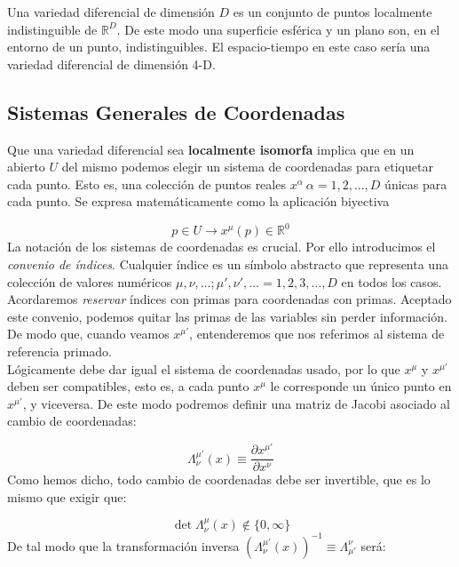\documentclass[12pt,a4paper]{book}
\numberwithin{equation}{section}
\numberwithin{figure}{section}
\newcommand{\parciales}[2]{\frac{\partial #1}{\partial #2}}
\begin{document}
Una variedad diferencial de dimensión $D$ es un conjunto de puntos localmente indistinguible de $\mathbb{R}^D$. De este modo una superficie esférica y un plano son, en el entorno de un punto, indistinguibles. El espacio-tiempo en este caso sería una variedad diferencial de dimensión 4-D. \\

\subsection{Sistemas Generales de Coordenadas}

Que una variedad diferencial sea \textbf{localmente isomorfa} implica que en un abierto $U$ del mismo podemos elegir un sistema de coordenadas para etiquetar cada punto. Esto es, una colección de puntos reales $x^{\alpha} \ \alpha=1,2,...,D$ únicas para cada punto. Se expresa matemáticamente como la aplicación biyectiva 

\begin{equation}
p \in U \longrightarrow x^{\mu} (p) \in \mathbb{R}^0
\end{equation}
La notación de los sistemas de coordenadas es crucial. Por ello introducimos el \textit{convenio de índices}. Cualquier índice es un símbolo abstracto que representa una colección de valores numéricos $\mu,\nu,\ldots;\mu',\nu',\ldots = 1,2,3,\ldots,D$ en todos los casos. Acordaremos \textit{reservar} índices con primas para coordenadas con primas. Aceptado este convenio, podemos quitar las primas de las variables sin perder información. De modo que, cuando veamos $x^{\mu'}$, entenderemos que nos referimos al sistema de referencia primado. \\

Lógicamente debe dar igual el sistema de coordenadas usado, por lo que $x^{\mu}$ y $x^{\mu'}$ deben ser compatibles, esto es, a cada punto $x^{\mu}$ le corresponde un único punto en $x^{\mu'}$, y  viceversa. De este modo podremos definir una matriz de Jacobi asociado al cambio de coordenadas:

\begin{equation}
\Lambda_{\nu}^{\mu'} (x) \equiv \parciales{x^{\mu'}}{x^{\nu}} 
\end{equation}
Como hemos dicho, todo cambio de coordenadas debe ser invertible, que es lo mismo que exigir que:

\begin{equation}
\det \Lambda^{\mu}_{\nu} (x) \notin \{ 0,\infty \}
\end{equation}
De tal modo que la transformación inversa $
(\Lambda_{\nu}^{\mu'} (x))^{-1} \equiv \Lambda_{\mu'}^{\nu}$  será:
\end{document}
